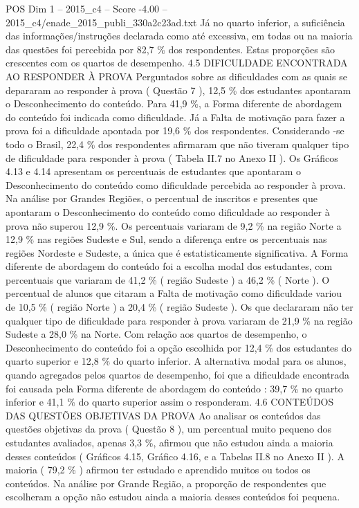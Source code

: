 \begin{textsample}{POS Dim 1 – 2015\_c4 – Score -4.00 – 2015\_c4/enade\_2015\_publi\_330a2c23ad.txt}
Já no quarto inferior, a suficiência das informações/instruções declarada como até excessiva, em todas ou na maioria das questões foi percebida por 82,7 \% dos respondentes.
Estas proporções são crescentes com os quartos de desempenho. 4.5 DIFICULDADE ENCONTRADA AO RESPONDER À PROVA Perguntados sobre as dificuldades com as quais se depararam ao responder à prova ( Questão 7 ), 12,5 \% dos estudantes apontaram o Desconhecimento do conteúdo.
Para 41,9 \%, a Forma diferente de abordagem do conteúdo foi indicada como dificuldade.
Já a Falta de motivação para fazer a prova foi a dificuldade apontada por 19,6 \% dos respondentes.
Considerando -se todo o Brasil, 22,4 \% dos respondentes afirmaram que não tiveram qualquer tipo de dificuldade para responder à prova ( Tabela II.7 no Anexo II ).
Os Gráficos 4.13 e 4.14 apresentam os percentuais de estudantes que apontaram o Desconhecimento do conteúdo como dificuldade percebida ao responder à prova.
Na análise por Grandes Regiões, o percentual de inscritos e presentes que apontaram o Desconhecimento do conteúdo como dificuldade ao responder à prova não superou 12,9 \%.
Os percentuais variaram de 9,2 \% na região Norte a 12,9 \% nas regiões Sudeste e Sul, sendo a diferença entre os percentuais nas regiões Nordeste e Sudeste, a única que é estatisticamente significativa.
A Forma diferente de abordagem do conteúdo foi a escolha modal dos estudantes, com percentuais que variaram de 41,2 \% ( região Sudeste ) a 46,2 \% ( Norte ).
O percentual de alunos que citaram a Falta de motivação como dificuldade variou de 10,5 \% ( região Norte ) a 20,4 \% ( região Sudeste ).
Os que declararam não ter qualquer tipo de dificuldade para responder à prova variaram de 21,9 \% na região Sudeste a 28,0 \% na Norte.
Com relação aos quartos de desempenho, o Desconhecimento do conteúdo foi a opção escolhida por 12,4 \% dos estudantes do quarto superior e 12,8 \% do quarto inferior.
A alternativa modal para os alunos, quando agregados pelos quartos de desempenho, foi que a dificuldade encontrada foi causada pela Forma diferente de abordagem do conteúdo : 39,7 \% no quarto inferior e 41,1 \% do quarto superior assim o responderam. 4.6 CONTEÚDOS DAS QUESTÕES OBJETIVAS DA PROVA Ao analisar os conteúdos das questões objetivas da prova ( Questão 8 ), um percentual muito pequeno dos estudantes avaliados, apenas 3,3 \%, afirmou que não estudou ainda a maioria desses conteúdos ( Gráficos 4.15, Gráfico 4.16, e a Tabelas II.8 no Anexo II ).
A maioria ( 79,2 \% ) afirmou ter estudado e aprendido muitos ou todos os conteúdos.
Na análise por Grande Região, a proporção de respondentes que escolheram a opção não estudou ainda a maioria desses conteúdos foi pequena.

\end{textsample}
